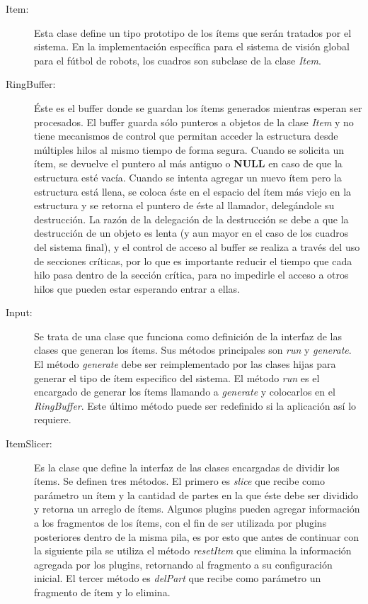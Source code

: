 \begin{description}

	\item[Item:] Esta clase define un tipo prototipo de los ítems que serán
		tratados por el sistema. En la implementación específica para el
		sistema de visión global para el fútbol de robots, los cuadros
		son subclase de la clase \emph{Item}.

	\item[RingBuffer:] Éste es el buffer donde se guardan los ítems
		generados mientras esperan ser procesados. El buffer guarda sólo
		punteros a objetos de la clase \emph{Item} y no tiene mecanismos
		de control que permitan acceder la estructura desde múltiples
		hilos al mismo tiempo de forma segura. Cuando se solicita un
		ítem, se devuelve el puntero al más antiguo o \textbf{NULL} en
		caso de que la estructura esté vacía. Cuando se intenta agregar
		un nuevo ítem pero la estructura está llena, se coloca éste en
		el espacio del ítem más viejo en la estructura y se retorna el
		puntero de éste al llamador, delegándole su destrucción. La
		razón de la delegación de la destrucción se debe a que la
		destrucción de un objeto es lenta (y aun mayor en el caso de los
		cuadros del sistema final), y el control de acceso al buffer se
		realiza a través del uso de secciones críticas, por lo que es
		importante reducir el tiempo que cada hilo pasa dentro de la
		sección crítica, para no impedirle el acceso a otros hilos que
		pueden estar esperando entrar a ellas.

	\item[Input:] Se trata de una clase que funciona como definición de la
		interfaz de las clases que generan los ítems. Sus métodos
		principales son \emph{run} y \emph{generate}. El método
		\emph{generate} debe ser reimplementado por las clases hijas
		para generar el tipo de ítem especifico del sistema. El método
		\emph{run} es el encargado de generar los ítems llamando a
		\emph{generate} y colocarlos en el \emph{RingBuffer}. Este
		último método puede ser redefinido si la aplicación así lo
		requiere.

	\item[ItemSlicer:] Es la clase que define la interfaz de las clases
		encargadas de dividir los ítems. Se definen tres métodos. El
		primero es \emph{slice} que recibe como parámetro un ítem y la
		cantidad de partes en la que éste debe ser dividido y retorna un
		arreglo de ítems. Algunos plugins pueden agregar información a
		los fragmentos de los ítems, con el fin de ser utilizada por
		plugins posteriores dentro de la misma pila, es por esto que
		antes de continuar con la siguiente pila se utiliza el método
		\emph{resetItem} que elimina la información agregada por los
		plugins, retornando al fragmento a su configuración inicial. El
		tercer método es \emph{delPart} que recibe como parámetro un
		fragmento de ítem y lo elimina.


\end{description}
